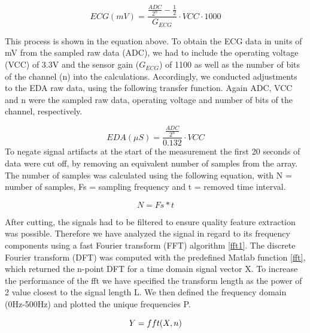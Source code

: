 \begin{equation}\label{transfECG}
ECG(mV) = \frac{\frac{ADC}{2^{n}}-\frac{1}{2}}{G_{ECG}} \cdot VCC \cdot 1000 
\end{equation}

This process is shown in the equation above. To obtain the ECG data in units of mV from the sampled raw data (ADC), we had to include the operating voltage (VCC) of 3.3V and the sensor gain ($G_{ECG}$) of 1100 as well as the number of bits of the channel (n) into the calculations.
Accordingly, we conducted adjustments to the EDA raw data, using the following transfer function. Again ADC, VCC and n were the sampled raw data, operating voltage and number of bits of the channel, respectively. 
 
\begin{equation}\label{transfEDA}
EDA (\mu S) = \frac{\frac{ADC}{2^{n}}}{0.132} \cdot VCC
\end{equation}
%
To negate signal artifacts at the start of the measurement the first 20 seconds of data were cut off, by removing an equivalent number of samples from the array. The number of samples was calculated using the following equation, with N = number of samples, Fs = sampling frequency and t = removed time interval.

\begin{equation}\label{NumberSamples}
N = Fs * t
\end{equation} 

After cutting, the signals had to be filtered to ensure quality feature extraction was possible. Therefore we have analyzed the signal in regard to its frequency components using a fast Fourier transform (FFT) algorithm \ref{fft1}. The discrete Fourier transform (DFT) was computed with the predefined Matlab function \ref{fft}, which returned the n-point DFT for a time domain signal vector X. To increase the performance of the fft we have specified the transform length as the power of 2 value closest to the signal length L. We then defined the frequency domain (0Hz-500Hz) and plotted the unique frequencies P.

\begin{equation}\label{fft}
Y = fft(X,n) \\
\end{equation}

